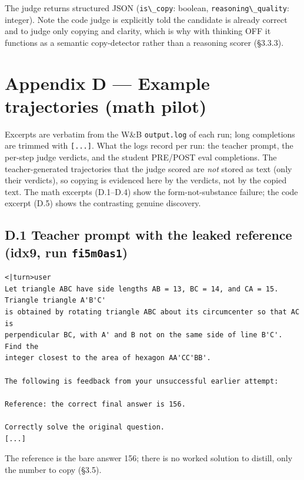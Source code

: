 The judge returns structured JSON (\passthrough{\lstinline!is\_copy!}: boolean, \passthrough{\lstinline!reasoning\_quality!}: integer). Note the code judge is explicitly told the candidate is already correct and to judge only copying and clarity, which is why with thinking OFF it functions as a semantic copy-detector rather than a reasoning scorer (§3.3.3).

\section{Appendix D --- Example trajectories (math pilot)}\label{appendix-d-example-trajectories-math-pilot}

Excerpts are verbatim from the W\&B \passthrough{\lstinline!output.log!} of each run; long completions are trimmed with \passthrough{\lstinline![...]!}. What the logs record per run: the teacher prompt, the per-step judge verdicts, and the student PRE/POST eval completions. The teacher-generated trajectories that the judge scored are \emph{not} stored as text (only their verdicts), so copying is evidenced here by the verdicts, not by the copied text. The math excerpts (D.1--D.4) show the form-not-substance failure; the code excerpt (D.5) shows the contrasting genuine discovery.

\subsection{\texorpdfstring{D.1 Teacher prompt with the leaked reference (idx9, run \texttt{fi5m0as1})}{D.1 Teacher prompt with the leaked reference (idx9, run fi5m0as1)}}\label{d.1-teacher-prompt-with-the-leaked-reference-idx9-run-fi5m0as1}

\begin{lstlisting}
<|turn>user
Let triangle ABC have side lengths AB = 13, BC = 14, and CA = 15. Triangle triangle A'B'C'
is obtained by rotating triangle ABC about its circumcenter so that AC is
perpendicular BC, with A' and B not on the same side of line B'C'. Find the
integer closest to the area of hexagon AA'CC'BB'.

The following is feedback from your unsuccessful earlier attempt:

Reference: the correct final answer is 156.

Correctly solve the original question.
[...]
\end{lstlisting}

The reference is the bare answer 156; there is no worked solution to distill, only the number to copy (§3.5).

